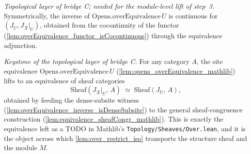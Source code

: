 \begin{lemma}
  \label{lem:overEquivalence_inverse_isContinuous}
  \textit{Topological layer of bridge C; needed for the module-level lift of step~3.}
  Symmetrically, the inverse of \(\mathrm{Opens.overEquivalence}\,U\) is continuous for
  \((J_U, J_X|_U)\), obtained from the cocontinuity of the functor
  (\cref{lem:overEquivalence_functor_isCocontinuous}) through the equivalence adjunction.
\end{lemma}

\begin{definition}
  \label{def:overEquivalence_sheafCongr}
  \textit{Keystone of the topological layer of bridge C.}
  For any category \(A\), the site equivalence \(\mathrm{Opens.overEquivalence}\,U\)
  (\cref{lem:opens_overEquivalence_mathlib}) lifts to an equivalence of sheaf categories
  \[
    \mathrm{Sheaf}(J_X|_U,\, A) \;\simeq\; \mathrm{Sheaf}(J_U,\, A),
  \]
  obtained by feeding the dense-subsite witness
  (\cref{lem:overEquivalence_inverse_isDenseSubsite}) to the general sheaf-congruence
  construction (\cref{lem:equivalence_sheafCongr_mathlib}). This is exactly the equivalence left
  as a TODO in Mathlib's \texttt{Topology/Sheaves/Over.lean}, and it is the object across which
  \cref{lem:over_restrict_iso} transports the structure sheaf and the module \(M\).
\end{definition}



